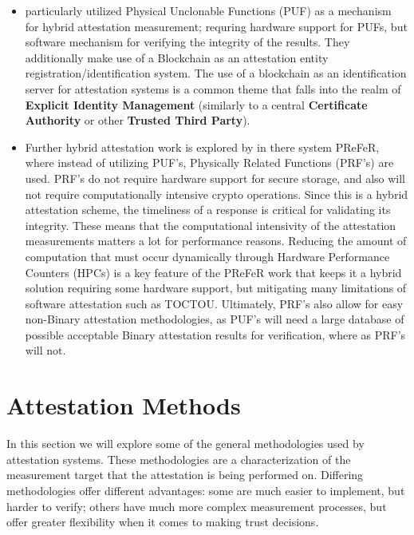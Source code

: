 \documentclass[acmsmall]{acmart}
\theoremstyle{definition}
\begin{document}
\begin{itemize}
  \item \citet{Javaid:2020:Defining-Trust-IoT-Blockchain-Attestation} particularly utilized Physical Unclonable Functions (PUF) as a mechanism for hybrid attestation measurement; requring hardware support for PUFs, but software mechanism for verifying the integrity of the results. They additionally make use of a Blockchain as an attestation entity registration/identification system.
        The use of a blockchain as an identification server for attestation systems is a common theme that falls into the realm of \textbf{Explicit Identity Management} (similarly to a central \textbf{Certificate Authority} or other \textbf{Trusted Third Party}).

  \item Further hybrid attestation work is explored by \citet{Mondal:2023:PReFeR-Attestation-Protocol} in there system PReFeR, where instead of utilizing PUF's, Physically Related Functions (PRF's) are used. PRF's do not require hardware support for secure storage, and also will not require computationally intensive crypto operations. Since this is a hybrid attestation scheme, the timeliness of a response is critical for validating its integrity. These means that the computational intensivity of the attestation measurements matters a lot for performance reasons. Reducing the amount of computation that must occur dynamically through Hardware Performance Counters (HPCs) is a key feature of the PReFeR work that keeps it a hybrid solution requiring some hardware support, but mitigating many limitations of software attestation such as TOCTOU.
        Ultimately, PRF's also allow for easy non-Binary attestation methodologies, as PUF's will need a large database of possible acceptable Binary attestation results for verification, where as PRF's will not.

\end{itemize}

\section{Attestation Methods}
In this section we will explore some of the general methodologies used by attestation systems.
These methodologies are a characterization of the measurement target that the attestation is
being performed on. Differing methodologies offer different advantages: some
are much easier to implement, but harder to verify; others have much more complex
measurement processes, but offer greater flexibility when it comes to making trust decisions.
\end{document}
